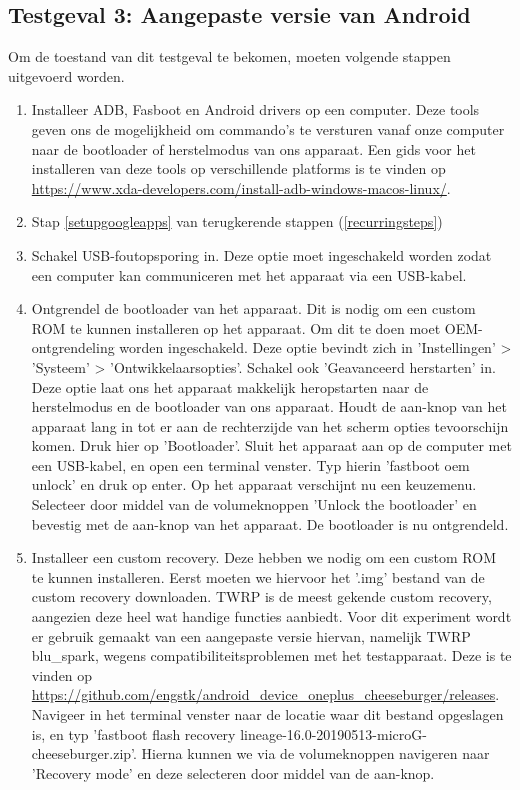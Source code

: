 \subsection{Testgeval 3: Aangepaste versie van Android}

Om de toestand van dit testgeval te bekomen, moeten volgende stappen uitgevoerd worden.

\begin{enumerate}
    \item Installeer ADB, Fasboot en Android drivers op een computer. Deze tools geven ons de mogelijkheid om commando's te versturen vanaf onze computer naar de bootloader of herstelmodus van ons apparaat. Een gids voor het installeren van deze tools op verschillende platforms is te vinden op \url{https://www.xda-developers.com/install-adb-windows-macos-linux/}.
    \item Stap \ref{setupgoogleapps} van terugkerende stappen (\ref{recurringsteps})
    \item Schakel USB-foutopsporing in. Deze optie moet ingeschakeld worden zodat een computer kan communiceren met het apparaat via een USB-kabel.
    \item Ontgrendel de bootloader van het apparaat. Dit is nodig om een custom ROM te kunnen installeren op het apparaat. Om dit te doen moet OEM-ontgrendeling worden ingeschakeld. Deze optie bevindt zich in 'Instellingen' > 'Systeem' > 'Ontwikkelaarsopties'. Schakel ook 'Geavanceerd herstarten' in. Deze optie laat ons het apparaat makkelijk heropstarten naar de herstelmodus en de bootloader van ons apparaat. Houdt de aan-knop van het apparaat lang in tot er aan de rechterzijde van het scherm opties tevoorschijn komen. Druk hier op 'Bootloader'. Sluit het apparaat aan op de computer met een USB-kabel, en open een terminal venster. Typ hierin 'fastboot oem unlock' en druk op enter. Op het apparaat verschijnt nu een keuzemenu. Selecteer door middel van de volumeknoppen 'Unlock the bootloader' en bevestig met de aan-knop van het apparaat. De bootloader is nu ontgrendeld.
    \item 
    Installeer een custom recovery. Deze hebben we nodig om een custom ROM te kunnen installeren. Eerst moeten we hiervoor het '.img' bestand van de custom recovery downloaden. TWRP is de meest gekende custom recovery, aangezien deze heel wat handige functies aanbiedt. Voor dit experiment wordt er gebruik gemaakt van een aangepaste versie hiervan, namelijk TWRP blu\_spark, wegens compatibiliteitsproblemen met het testapparaat. Deze is te vinden op \url{https://github.com/engstk/android_device_oneplus_cheeseburger/releases}. Navigeer in het terminal venster naar de locatie waar dit bestand opgeslagen is, en typ 'fastboot flash recovery lineage-16.0-20190513-microG-cheeseburger.zip'. Hierna kunnen we via de volumeknoppen navigeren naar 'Recovery mode' en deze selecteren door middel van de aan-knop.

\end{enumerate}
